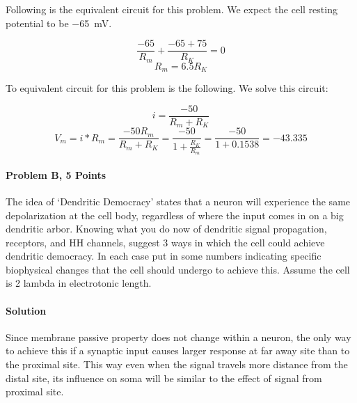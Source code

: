 \documentclass[a4paper,10pt]{article}
\begin{document}
Following is the equivalent circuit for this problem. We expect the cell resting
potential to be \SI{-65}{\milli \volt}. 

$$ \frac{-65}{R_m}  + \frac{-65 +75}{R_K} = 0$$
$$ R_m = 6.5 R_K $$


To equivalent circuit for this problem is the following. We solve this circuit:

$$ i = \frac{-50}{R_m + R_K} $$
$$ V_m = i * R_m = \frac{-50 R_m}{R_m + R_K} = \frac{-50}{1 + \frac{R_K}{R_m}} =
\frac{-50}{1+0.1538} = - 43.335 $$





\paragraph{Problem B, 5 Points} The idea of ‘Dendritic Democracy’ states that a
neuron will experience the same depolarization at the cell body, regardless of
where the input comes in on a big dendritic arbor. Knowing what you do now of
dendritic signal propagation, receptors, and HH channels, suggest 3 ways in
which the cell could achieve dendritic democracy. In each case put in some
numbers indicating specific biophysical changes that the cell should undergo to
achieve this. Assume the cell is 2 lambda in electrotonic length.

\paragraph{Solution} Since membrane passive property does not change within a
neuron, the only way to achieve this if a synaptic input causes larger response
at far away site than to the proximal site. This way even when the signal
travels more distance from the distal site, its influence on soma will be
similar to the effect of signal from proximal site.
\end{document}
